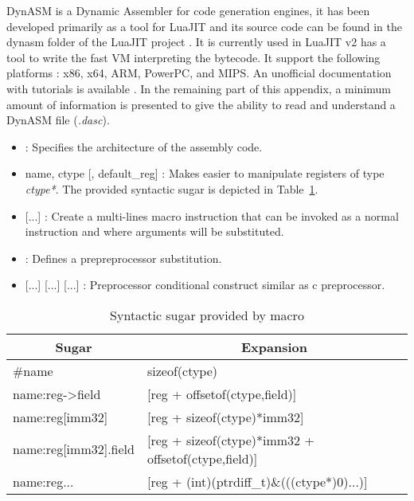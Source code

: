 DynASM is a Dynamic Assembler for code generation engines, it has been developed
primarily as a tool for LuaJIT and its source code can be found in the dynasm
folder of the LuaJIT project \cite{luajit-src}. It is currently used in LuaJIT
v2 has a tool to write the fast VM interpreting the bytecode. It support the
following platforms : x86, x64, ARM, PowerPC, and MIPS. An unofficial
documentation with tutorials is available \cite{dynasm}. In the remaining part
of this appendix, a minimum amount of information is presented to give the
ability to read and understand a DynASM file (\emph{.dasc}).



\begin{itemize}
	\item {} : Specifies the architecture of the assembly code.
	\item {} name, ctype [, default\_reg] : Makes easier to manipulate registers of type \emph{ctype*}. The provided syntactic sugar is depicted in
Table~\ref{tab:type-sugar}.
	\item {} [...]  : Create a multi-lines
macro instruction that can be invoked as a normal instruction and where arguments
will be substituted.
 	\item {} : Defines a prepreprocessor substitution.
	\item {} [...]  [...]  [...]  : Preprocessor conditional construct similar as c preprocessor.
\end{itemize}

\begin{table}
\centering
\begin{tabular}{|l|l|}
\hline
\multicolumn{1}{|c|}{Sugar} & \multicolumn{1}{c|}{Expansion} \\\hline
\#name						& sizeof(ctype)\\
name:reg-\textgreater field	& [reg + offsetof(ctype,field)]\\
name:reg[imm32]				& [reg + sizeof(ctype)*imm32]\\
name:reg[imm32].field 		& [reg + sizeof(ctype)*imm32 + offsetof(ctype,field)]\\
name:reg...					& [reg + (int)(ptrdiff\_t)\&(((ctype*)0)...)]\\\hline
\end{tabular}
\caption{Syntactic sugar provided by  macro}
\label{tab:type-sugar}
\end{table}

